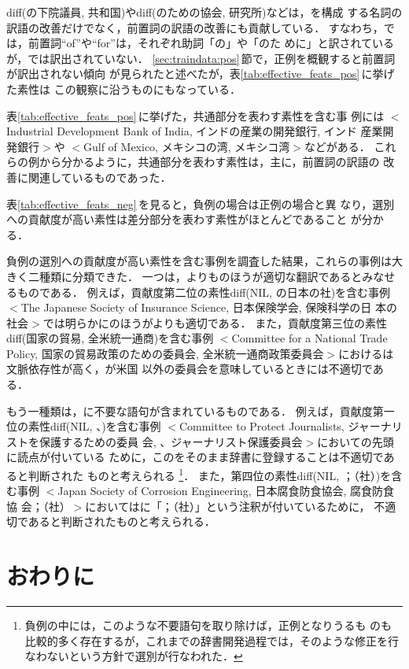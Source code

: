 diff(の下院議員, 共和国)やdiff(のための協会, 研究所)などは，{\ENP}を構成
する名詞の訳語の改善だけでなく，前置詞の訳語の改善にも貢献している．
すなわち，{\CT}では，前置詞``of''や``for''は，それぞれ助詞「の」や「のた
めに」と訳されているが，{\NT}では訳出されていない．
\ref{sec:traindata:pos}\,節で，正例を概観すると前置詞が訳出されない傾向
が見られたと述べたが，表\ref{tab:effective_feats_pos}\,に挙げた素性は
この観察に沿うものにもなっている．

表\ref{tab:effective_feats_pos}\,に挙げた，共通部分を表わす素性を含む事
例には
$<$Industrial Development Bank of India, インドの産業の開発銀行, インド
産業開発銀行$>$や
$<$Gulf of Mexico, メキシコの湾, メキシコ湾$>$などがある．
これらの例から分かるように，共通部分を表わす素性は，主に，前置詞の訳語の
改善に関連しているものであった．

表\ref{tab:effective_feats_neg}\,を見ると，負例の場合は正例の場合と異
なり，選別への貢献度が高い素性は差分部分を表わす素性がほとんどであること
が分かる．

負例の選別への貢献度が高い素性を含む事例を調査した結果，これらの事例は大
きく二種類に分類できた．
一つは，{\NT}よりも{\CT}のほうが適切な翻訳であるとみなせるものである．
例えば，貢献度第二位の素性diff(NIL, の日本の社)を含む事例
$<$The Japanese Society of Insurance Science, 日本保険学会, 保険科学の日
本の社会$>$では明らかに{\CT}のほうが{\NT}よりも適切である．
また，貢献度第三位の素性diff(国家の貿易, 全米統一通商)を含む事例
$<$Committee for a National Trade Policy, 国家の貿易政策のための委員会, 
全米統一通商政策委員会$>$における{\NT}は文脈依存性が高く，{\ENP}が米国
以外の委員会を意味しているときには不適切である．

もう一種類は，{\NT}に不要な語句が含まれているものである．
例えば，貢献度第一位の素性diff(NIL, 、)を含む事例
$<$Committee to Protect Journalists, ジャーナリストを保護するための委員
会, 、ジャーナリスト保護委員会$>$において{\NT}の先頭に読点が付いている
ために，この{\NT}をそのまま辞書に登録することは不適切であると判断された
ものと考えられる
\footnote{負例の中には，このような不要語句を取り除けば，正例となりうるも
のも比較的多く存在するが，これまでの辞書開発過程では，そのような修正を行
なわないという方針で選別が行なわれた．}．
また，第四位の素性diff(NIL, ；（社）)を含む事例
$<$Japan Society of Corrosion Engineering, 日本腐食防食協会, 腐食防食協
会；（社）$>$においては{\NT}に「；（社）」という注釈が付いているために，
不適切であると判断されたものと考えられる．


\section{おわりに}

